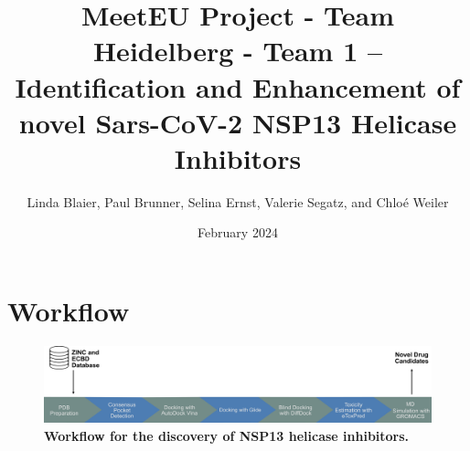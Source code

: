 \documentclass[11pt, letterpaper, titlepage]{article}
\title{MeetEU Project - Team Heidelberg - Team 1 -- \\ Identification and Enhancement of novel Sars-CoV-2 NSP13 Helicase Inhibitors}
\author{Linda Blaier, Paul Brunner, Selina Ernst, Valerie Segatz, and Chlo\'{e} Weiler}
\date{February 2024}
\begin{document}
\maketitle

\ihead{\headmark}
\cfoot{\pagemark}   %

\section{Workflow}

\begin{figure}[h]
  \centering
  \includegraphics[width=\textwidth]{Workflow_MeetEU.pdf}
  \caption*{\textbf{Workflow for the discovery of NSP13 helicase inhibitors.}}
  \label{workflow}
\end{figure}

\setcounter{figure}{0}
\renewcommand{\thefigure}{\arabic{figure}}
\end{document}
